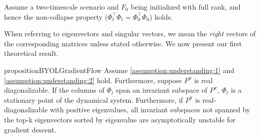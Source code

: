 \begin{assumption}
\label{assumption:understanding:3}
    Assume a two-timescale scenario and $F_0$ being initialized with full rank, and hence the non-collapse property ($\Phi_t^\top\Phi_t = \Phi_0^\top\Phi_0$) \parencite{tang2022understanding} holds.
\end{assumption}
When referring to eigenvectors and singular vectors, we mean the \emph{right} vectors of the corresponding matrices unless stated otherwise.
We now present our first theoretical result.

\begin{restatable}{proposition}{BYOLGradientFlow}\label{prop:understanding:1}
Assume \autoref{assumption:understanding:1} and \autoref{assumption:understanding:2} hold.
Furthermore, suppose $P^\pi$ is real diagonalizable. 
If the columns of $\Phi_t$ span an invariant subspace of $P^\pi$, $\Phi_t$ is a stationary point of the dynamical system.
Furthermore, if $P^\pi$ is real-diagonalizable with positive eigenvalues, all invariant subspaces not spanned by the top-k eigenvectors sorted by eigenvalue are asymptotically unstable for gradient descent.
\end{restatable}

